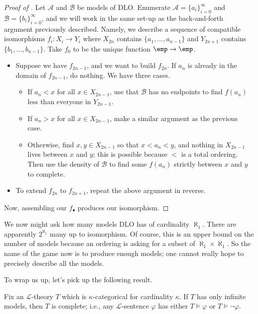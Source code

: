 \documentclass[../notes.tex]{subfiles}
\begin{document}
\begin{proof}[Proof of ]
	Let $\mathcal A$ and $\mathcal B$ be models of $\mathrm{DLO}$. Enumerate $\mathcal A=\{a_i\}_{i=0}^\infty$ and $\mathcal B=\{b_i\}_{i=0}^\infty$, and we will work in the same set-up as the back-and-forth argument previously described. Namely, we describe a sequence of compatible isomorphisms $f_i\colon X_i\to Y_i$ where $X_{2n}$ contains $\{a_1,\ldots,a_{n-1}\}$ and $Y_{2n+1}$ contains $\{b_1,\ldots,b_{n-1}\}$. Take $f_0$ to be the unique function $\emp\to\emp$.
	\begin{itemize}
		\item Suppose we have $f_{2n-1}$, and we want to build $f_{2n}$. If $a_n$ is already in the domain of $f_{2n-1}$, do nothing. We have three cases.
		\begin{itemize}
			\item If $a_n<x$ for all $x\in X_{2n-1}$, use that $\mathcal B$ has no endpoints to find $f(a_n)$ less than everyone in $Y_{2n-1}$.
			\item If $a_n>x$ for all $x\in X_{2n-1}$, make a similar argument as the previous case.
			\item Otherwise, find $x,y\in X_{2n-1}$ so that $x<a_n<y$, and nothing in $X_{2n-1}$ lives between $x$ and $y$; this is possible because $<$ is a total ordering. Then use the density of $\mathcal B$ to find some $f(a_n)$ strictly between $x$ and $y$ to complete.
		\end{itemize}
		\item To extend $f_{2n}$ to $f_{2n+1}$, repeat the above argument in reverse.
	\end{itemize}
	Now, assembling our $f_\bullet$ produces our isomorphism.
\end{proof}
\begin{remark}
	We now might ask how many models $\mathrm{DLO}$ has of cardinality $\aleph_1$. There are apparently $2^{\aleph_1}$ many up to isomorphism. Of course, this is an upper bound on the number of models because an ordering is asking for a subset of $\aleph_1\times\aleph_1$. So the name of the game now is to produce enough models; one cannot really hope to precisely describe all the models.
\end{remark}
To wrap us up, let's pick up the following result.
\begin{proposition}
	Fix an $\mathcal L$-theory $T$ which is $\kappa$-categorical for cardinality $\kappa$. If $T$ has only infinite models, then $T$ is complete; i.e., any $\mathcal L$-sentence $\varphi$ has either $T\models\varphi$ or $T\models\lnot\varphi$.
\end{proposition}
\end{document}
